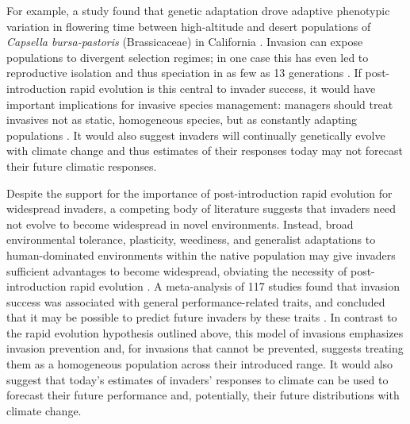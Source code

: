 \documentclass[11pt]{article}\usepackage[]{graphicx}\usepackage[]{color}
\begin{document}
 For example, a study found that genetic adaptation drove adaptive phenotypic variation in flowering time between high-altitude and desert populations of \textit{Capsella bursa-pastoris} (Brassicaceae) in California \parencite{Linde2001}. Invasion can expose populations to divergent selection regimes; in one case this has even led to reproductive isolation and thus speciation in as few as 13 generations \parencite{Hendry2000}. If post-introduction rapid evolution is this central to invader success, it would have important implications for invasive species management: managers should treat invasives not as static, homogeneous species, but as constantly adapting populations \parencite{Lee2002invasion}. It would also suggest invaders will continually genetically evolve with climate change and thus estimates of their responses today may not forecast their future climatic responses. 
	
	Despite the support for the importance of post-introduction rapid evolution for widespread invaders, a competing body of literature suggests that invaders need not evolve to become widespread in novel environments. Instead, broad environmental tolerance, plasticity, weediness, and generalist adaptations to human-dominated environments within the native population may give invaders sufficient advantages to become widespread, obviating the necessity of post-introduction rapid evolution \parencite{Richards2006,Schwartz1994,Bock2015,Rejmanek1996,Baker1965}. A meta-analysis of 117 studies found that invasion success was associated with general performance-related traits, and concluded that it may be possible to predict future invaders by these traits \parencite{VanKleunen2010}. %
	In contrast to the rapid evolution hypothesis outlined above, this model of invasions emphasizes invasion prevention and, for invasions that cannot be prevented, suggests treating them as a homogeneous population across their introduced range. It would also suggest that today's estimates of invaders' responses to climate can be used to forecast their future performance and, potentially, their future distributions with climate change. 
	
\end{document}
